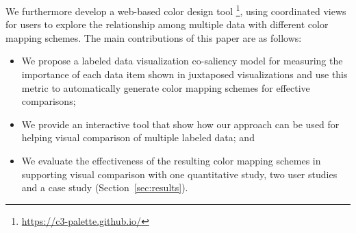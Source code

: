 We furthermore develop a web-based color design tool \footnote{\small \url{https://c3-palette.github.io/}}, using coordinated views for users to explore the relationship among multiple data with different color mapping schemes. %
The main contributions of this paper are as follows:
\vspace*{-2mm}
\begin{itemize}[noitemsep]
\setlength{\itemsep}{5pt}
  \item We propose a labeled data visualization co-saliency model for measuring the importance of each data item shown in juxtaposed visualizations and use this metric to automatically generate color mapping schemes for effective comparisons;
    \item
  We provide an interactive tool that show how our approach can be used for helping visual comparison of multiple labeled data; and
  \item
   We evaluate the effectiveness of the resulting color mapping schemes in supporting visual comparison with one quantitative study, two user studies and a case study (Section~\ref{sec:results}).

\end{itemize}

